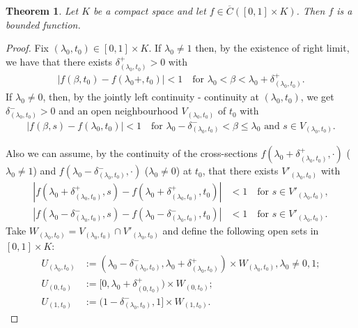 \documentclass{amsart}
\newtheorem{theorem}{Theorem}[section]
\begin{document}
\begin{theorem}\label{th:bounded1}
Let $K$ be a compact space and
let $f\in \overline{C}([0,1]\times K)$.
Then $f$ is a bounded function.
\end{theorem}
\begin{proof}
Fix $(\lambda_0,t_0)\in [0,1]\times K$. If $\lambda_0\neq 1$ then, by the existence of right limit, we have that there exists
$\delta_{(\lambda_0,t_0)}^+ >0$ with
\begin{align}\label{eqRL1}
|f(\beta,t_0)-f(\lambda_0+,t_0)|<1 \quad \text{for $\lambda_0<\beta<\lambda_0 +\delta_{(\lambda_0,t_0)}^+$}.
\end{align}
If $\lambda_0\neq 0$, then, by the jointly left continuity - continuity at $(\lambda_0, t_0)$, we get $\delta_{(\lambda_0,t_0)}^->0$ and an open neighbourhood $V_{(\lambda_0,t_0)}$ of $t_0$
with
\begin{align}\label{eqRL2}
|f(\beta,s)-f(\lambda_0,t_0)|<1 \quad \text{for $\lambda_0-\delta_{(\lambda_0,t_0)}^-<\beta\leq \lambda_0$ and $s\in V_{(\lambda_0,t_0)}$.}
\end{align}

Also we can assume, by the continuity of the cross-sections $f(\lambda_0 +\delta_{(\lambda_0,t_0)}^+,\cdot)$ ($\lambda_0\neq 1$) and
$f(\lambda_0 -\delta_{(\lambda_0,t_0)}^-,\cdot)$ ($\lambda_0\neq  0$) at $t_0$, that there exists $V'_{(\lambda_0,t_0)}$ with
\begin{align}\label{eqRL3}
|f(\lambda_0 +\delta_{(\lambda_0,t_0)}^+,s)-f(\lambda_0 +\delta_{(\lambda_0,t_0)}^+,t_0)|&<1 \quad \text{for $s\in V'_{(\lambda_0,t_0)}$},\\
\label{eqRL4}
|f(\lambda_0 -\delta_{(\lambda_0,t_0)}^-,s)-f(\lambda_0 -\delta_{(\lambda_0,t_0)}^-,t_0)|&<1 \quad \text{for $s\in V'_{(\lambda_0,t_0)}$}.
\end{align}
Take $W_{(\lambda_0,t_0)}=V_{(\lambda_0,t_0)}\cap V'_{(\lambda_0,t_0)}$ and  define the following open sets in $[0,1]\times K$:
\begin{align*}
U_{(\lambda_0,t_0)}&:=(\lambda_0 -\delta_{(\lambda_0,t_0)}^-,\lambda_0 +\delta_{(\lambda_0,t_0)}^+)\times W_{(\lambda_0,t_0)}, \lambda_0\neq 0,1;\\
U_{(0,t_0)}&:=[0,\lambda_0 +\delta_{(0,t_0)}^+)\times W_{(0,t_0)};\\
U_{(1,t_0)}&:=(1 -\delta_{(\lambda_0,t_0)}^-,1]\times W_{(1,t_0)}.
\end{align*}


\end{proof}
\end{document}
